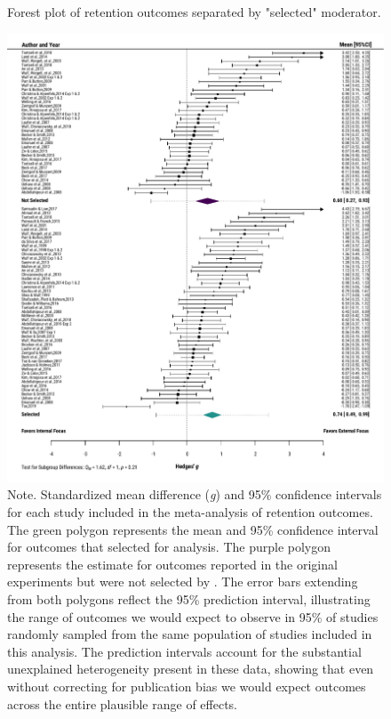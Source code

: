 \documentclass[man,floatsintext,letterpaper,12pt]{apa7}
\begin{document}
\begin{figure}[htbp]
    \caption{Forest plot of retention outcomes separated by "selected" moderator.}
    \centering
    \includegraphics[scale=0.62]{../../figs/fig2.pdf}
    \setlength{\belowcaptionskip}{-2em}
    \caption*{\singlespacing \small Note. \normalfont Standardized mean difference (\emph{g}) and 95\% confidence intervals for each study included in the meta-analysis of retention outcomes. The green polygon represents the mean and 95\% confidence interval for outcomes that \textcite{chua2021} selected for analysis. The purple polygon represents the estimate for outcomes reported in the original experiments but were not selected by \textcite{chua2021}. The error bars extending from both polygons reflect the 95\% prediction interval, illustrating the range of outcomes we would expect to observe in 95\% of studies randomly sampled from the same population of studies included in this analysis. The prediction intervals account for the substantial unexplained heterogeneity present in these data, showing that even without correcting for publication bias we would expect outcomes across the entire plausible range of effects.}
    \label{fig:fig2}
\end{figure}
\end{document}
